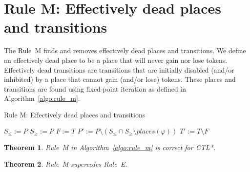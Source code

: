 \documentclass[11pt]{article}
\newtheorem{theorem}{Theorem}
\begin{document}
    \section*{Rule M: Effectively dead places and transitions}\label{sec:rule_m}
    The Rule~M finds and removes effectively dead places and transitions.
    We define an effectively dead place to be a place that will never gain nor lose tokens.
    Effectively dead transitions are transitions that are initially disabled (and/or inhibited)
    by a place that cannot gain (and/or lose) tokens.
    These places and transitions are found using fixed-point iteration as defined in Algorithm~\ref{algo:rule_m}.

    \begin{algorithm}
        \vspace{0.2cm}
        \caption{Rule M: Effectively dead places and transitions}
        \label{algo:rule_m}
        \DontPrintSemicolon
        \LinesNumbered
        \vspace{1mm}
        $S_\leq:=P$
        $S_\geq:=P$
        $F:=T$
        $P':=P\setminus(S_\leq\cap S_\geq\setminus places(\varphi))$\;
        $T':=T\setminus F$\;
        \vspace{0.2cm}
    \end{algorithm}

    \begin{theorem}\label{theorem:rule_m}
        Rule~M in Algorithm~\ref{algo:rule_m} is correct for CTL*.
    \end{theorem}
    \begin{theorem}\label{theorem:rule_m_supercedes_e}
    Rule~M supercedes Rule~E.
    \end{theorem}
\end{document}

